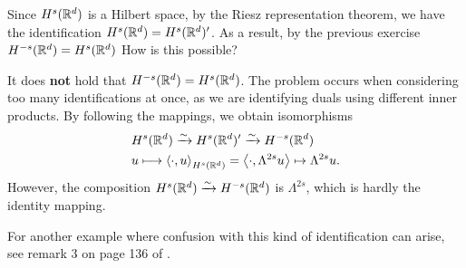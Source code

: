 \documentclass[
    a4paper,
    DIV=14,
    abstract=true,
    numbers=noenddot
]{scrartcl}
\begin{document}
\begin{exercise}
    Since $H^{s}(\mathbb{R}^d)$ is a Hilbert space, by the Riesz representation theorem, we have the identification $H^s(\mathbb{R}^d) = H^{s}(\mathbb{R}^d)'$. As a result, by the previous exercise $H^{-s}(\mathbb{R}^d)= H^s(\mathbb{R}^d)$ How is this possible?
\end{exercise}
\begin{hint}
    It does \textbf{not} hold that $H^{-s}(\mathbb{R}^d)= H^s(\mathbb{R}^d)$. The problem occurs when considering too many identifications at once, as we are identifying duals using different inner products. By following the mappings, we obtain isomorphisms
    \begin{align*}
         & H^{s}(\mathbb{R}^d) \xrightarrow{\sim}   H^s(\mathbb{R}^d)' \xrightarrow{\sim} H^{-s}(\mathbb{R}^d)                                                 \\
         & u \longmapsto   \left\langle\cdot, u\right\rangle_{H^s(\mathbb{R}^d)}= \left\langle\cdot, \Lambda^{2s} u \right\rangle \mapsto \Lambda ^{2s} u.
    \end{align*}
    However, the composition $H^s(\mathbb{R}^d) \xrightarrow{\sim} H^{-s}(\mathbb{R}^d)$  is $\Lambda ^{2s}$, which is hardly the identity mapping.
\end{hint}
For another example where confusion with this kind of identification can arise, see remark 3 on page  136 of \cite{brezis2011functional}.
\end{document}
